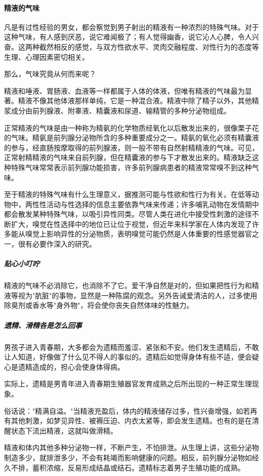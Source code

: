 \paragraph{精液的气味}

凡是有过性经验的男女，都会察觉到男子射出的精液有一种浓烈的特殊气味。对于这种气味，有人感到厌恶，说它难闻极了；有人觉得幽香，说它沁人心脾，令人兴奋。这两种截然相反的感觉，与双方性欲水平、灵肉交融程度、对性行为的态度等生理、心理因素密切相关。

那么，气味究竟从何而来呢？

精液和唾液、胃肠液、血液等一样都属于人体的体液，但唯有精液的气味最为显著。精液不像其他体液那样单纯，它是一种混合液。精液中除了精子以外，其他精浆成分由前列腺液、附睾液、精囊液和尿道、输精管的多种分泌物组成。

正常精液的气味是由一种称为精氨的化学物质经氧化以后散发出来的，很像栗子花的气味。精氨是前列腺分泌物所含的多种重要成分之一。精氨的氧化必须有精囊液的参与，经直肠按摩取得的前列腺液，则一般不带有自然射精精液的气味。可见，正常射精精液的气味来自前列腺，但在精囊液的参与下才散发出来的。精液缺乏这种特殊气味常常表示前列腺功能损害，许多前列腺病患者的精液常常嗅不到这种气味。

至于精液的特殊气味有什么生理意义，据推测可能与性欲和性行为有关。在低等动物中，两性性活动与性选择的信息主要依靠气味来传递；许多哺乳动物在发情期中都会散发某种特殊气味，以吸引异性同类。尽管人类在进化中接受性刺激的途径不断扩大，嗅觉在性选择中的地位已让位于视觉，但近年来科学家在人体内发现了许多能从嗅觉上影响异性的分泌物质，表明嗅觉可能仍然是人体重要的性感觉器官之一，很有必要作深入的研究。

\subparagraph{贴心小叮咛}

精液的气味不必消除它，也消除不了它。爱干净自然是对的，但如果把性行为和精液等视为"肮脏"的事物，显然是一种陈腐的观念。另外告诫爱清洁的人，过多使用除臭剂或香水等"身外物"，将会使你丧失自然体味的性魅力。

\subparagraph{遗精、滑精各是怎么回事}

男孩子进入青春期，大多都会为遗精而羞涩、紧张和不安。他们发生遗精后，不敢让人知道，好像做了什么见不得人的事似的。遗精后如觉得身体有些不适，便会疑心是遗精造成的，担心会使身体得病。

实际上，遗精是男青年进入青春期生殖器官发育成熟之后所出现的一种正常生理现象。

俗话说："精满自溢。"当精液充盈后，体内的精液储存过多，性兴奋增强，如若再有其他刺激，如梦见异性、被褥压迫、内衣太紧等，即会发生遗精。也有的是在清醒状态下流出精液，这就叫做滑精。

精液和体内其他多种分泌物一样，不断产生，不怕排泄。从生理上讲，这些分泌物制造多少，就排泄多少，不会有耗竭而影响健康的问题。相反，前列腺分泌物如经久不排，蓄积浓缩，反易形成结晶或结石。遗精标志着男子生殖功能的成熟。

